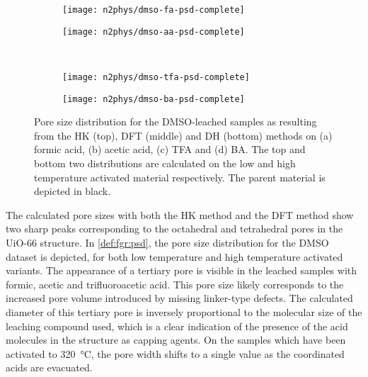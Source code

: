 \begin{figure}[p]
    \centering

    \begin{subfigure}{0.4\linewidth}
		\parbox[c]{0.12\linewidth}{\caption{}%
			\label{def:fgr:psd-dmso-fa}}%
		\parbox[b]{0.88\linewidth}{%
			\texttt{[image: n2phys/dmso-fa-psd-complete]}%
		}%
    \end{subfigure}%
    \begin{subfigure}{0.4\linewidth}
		\parbox[c]{0.12\linewidth}{\caption{}%
			\label{def:fgr:psd-dmso-aa}}%
		\parbox[b]{0.88\linewidth}{%
			\texttt{[image: n2phys/dmso-aa-psd-complete]}%
		}%
    \end{subfigure}%
    \\
    \begin{subfigure}{0.4\linewidth}
		\parbox[c]{0.12\linewidth}{\caption{}%
			\label{def:fgr:psd-dmso-tfa}}%
		\parbox[b]{0.88\linewidth}{%
			\texttt{[image: n2phys/dmso-tfa-psd-complete]}%
		}%
    \end{subfigure}%
    \begin{subfigure}{0.4\linewidth}
		\parbox[c]{0.12\linewidth}{\caption{}%
			\label{def:fgr:psd-dmso-ba}}%
		\parbox[b]{0.88\linewidth}{%
			\texttt{[image: n2phys/dmso-ba-psd-complete]}%
		}%
    \end{subfigure}%

    \caption{Pore size distribution for the DMSO-leached
    samples as resulting from the HK (top), DFT (middle) and DH 
    (bottom) methods on (a) formic acid, (b) acetic acid, (c) TFA and 
    (d) BA. The top and bottom two distributions are
    calculated on the low and high temperature activated material
    respectively. The parent material is depicted in black.}%
    \label{def:fgr:psd}
        
\end{figure}

The calculated pore sizes with both the HK method and the DFT method 
show two sharp peaks corresponding to the octahedral and tetrahedral
pores in the UiO-66 structure. In \autoref{def:fgr:psd}, the pore
size distribution for the DMSO dataset is depicted, for both low
temperature and high temperature activated variants. The appearance of 
a tertiary pore is visible in the leached samples with formic,
acetic and trifluoroacetic acid. This pore size likely corresponds
to the increased pore volume introduced by missing linker-type 
defects. The calculated diameter of this tertiary pore is
inversely proportional to the molecular size of the 
leaching compound used, which is a clear indication of the presence of 
the acid molecules in the structure as capping agents. On the samples
which have been activated to \SI{320}{\degreeCelsius}, the pore width
shifts to a single value as the coordinated acids are evacuated.

